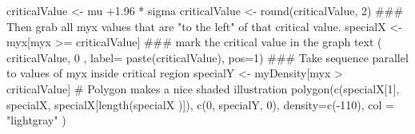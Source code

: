 \begin{Schunk}
\begin{Sinput}
 criticalValue <- mu +1.96 * sigma
 criticalValue <- round(criticalValue, 2)
 ### Then grab all myx values that are "to the left" of that critical value.
 specialX <-  myx[myx >= criticalValue]
 ### mark the critical value in the graph
 text ( criticalValue, 0 , label= paste(criticalValue), pos=1)
 ### Take sequence parallel to values of myx inside critical region
 specialY <- myDensity[myx > criticalValue]
 #  Polygon makes a nice shaded illustration
 polygon(c(specialX[1], specialX, specialX[length(specialX )]), c(0, specialY, 0), density=c(-110), col = "lightgray" )
\end{Sinput}
\end{Schunk}

